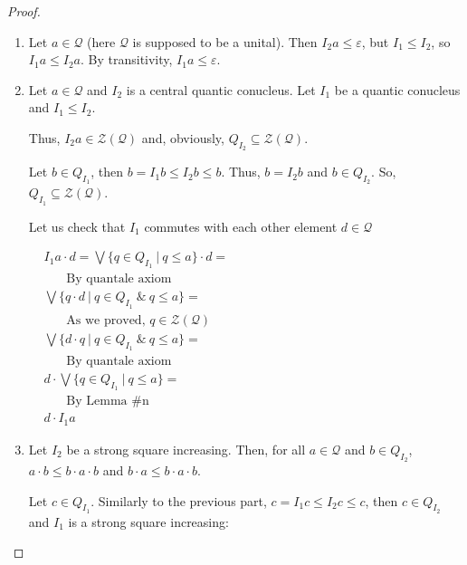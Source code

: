 \documentclass[a4paper]{article}
\theoremstyle{defin}
\theoremstyle{theorem}
\theoremstyle{prop}
\theoremstyle{lemma}
\theoremstyle{ex}
\theoremstyle{col}
\begin{document}
\begin{proof}
  $ $

\begin{enumerate}
  \item Let $a \in \mathcal{Q}$ (here $\mathcal{Q}$ is supposed to be a unital).
  Then $I_2 a \leq \varepsilon$, but $I_1 \leq I_2$, so $I_1 a \leq I_2 a$. By transitivity, $I_1 a \leq \varepsilon$.
  \item Let $a \in \mathcal{Q}$ and $I_2$ is a central quantic conucleus. Let $I_1$ be a quantic conucleus and $I_1 \leq I_2$.


  Thus, $I_2 a \in \mathcal{Z}(\mathcal{Q})$ and, obviously, $Q_{I_2} \subseteq \mathcal{Z}(\mathcal{Q})$.

  Let $b \in Q_{I_1}$, then $b = I_1 b \leq I_2 b \leq b$. Thus, $b = I_2 b$ and $b \in Q_{I_2}$. So, $Q_{I_1} \subseteq \mathcal{Z}(\mathcal{Q})$.

  Let us check that $I_1$ commutes with each other element $d \in \mathcal{Q}$

  $\begin{array}{lll}
  & I_1 a \cdot d = \bigvee \{ q \in Q_{I_1} \: | \: q \leq a \} \cdot d = & \\
  & \:\:\:\:\:\:\:\: \text{By quantale axiom}& \\
  & \bigvee \{ q \cdot d \: | \: q \in Q_{I_1} \: \& \: q \leq a \} = & \\
  & \:\:\:\:\:\:\:\: \text{As we proved, $q \in \mathcal{Z}(\mathcal{Q})$} & \\
  & \bigvee \{ d \cdot q \: | \: q \in Q_{I_1} \: \& \: q \leq a \} = & \\
  & \:\:\:\:\:\:\:\: \text{By quantale axiom}& \\
  & d \cdot \bigvee \{ q \in Q_{I_1} \: | \: q \leq a \} = & \\
  & \:\:\:\:\:\:\:\: \text{By Lemma \# n}& \\
  & d \cdot I_1 a &
  \end{array}$

  \item Let $I_2$ be a strong square increasing. Then, for all $a \in \mathcal{Q}$ and $b \in Q_{I_2}$,
  $a \cdot b \leq b \cdot a \cdot b$ and $b \cdot a \leq b \cdot a \cdot b$.

  Let $c \in Q_{I_1}$. Similarly to the previous part, $c = I_1 c \leq I_2 c \leq c$, then $c \in Q_{I_2}$ and
  $I_1$ is a strong square increasing:


\end{enumerate}
\end{proof}
\end{document}
